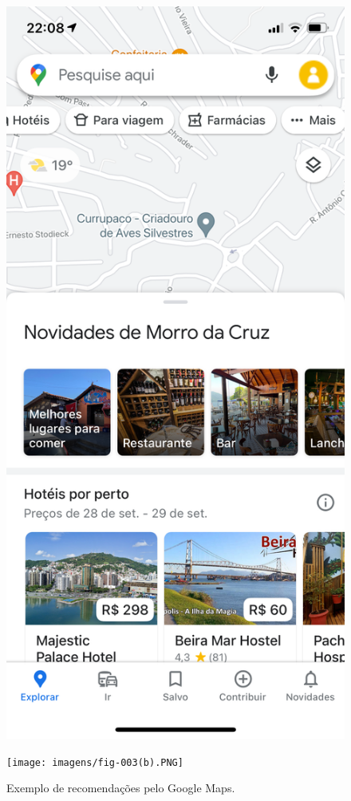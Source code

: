\documentclass[portuguese]{textolivre}
\begin{document}
\begin{figure}[htbp]
\begin{minipage}[t]{0.47\textwidth}
\includegraphics[width=\linewidth]{imagens/fig-003(a).png}
\end{minipage}
\hfill
\begin{minipage}[t]{0.47\textwidth}
\texttt{[image: imagens/fig-003(b).PNG]}
\end{minipage}

\caption{Exemplo de recomendações pelo Google Maps.}
\label{fig:twosubs}
\end{figure}
\end{document}
